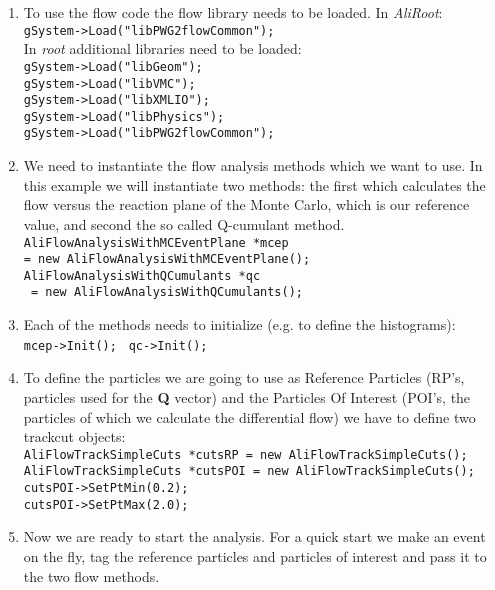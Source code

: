 \begin{enumerate}
\item
To use the flow code the flow library needs to be loaded. In  \textit{AliRoot}:\\
\texttt{gSystem->Load("libPWG2flowCommon");}\\
In  \textit{root} additional libraries need to be loaded: \\
\texttt{gSystem->Load("libGeom");}\\
\texttt{gSystem->Load("libVMC");}\\
\texttt{gSystem->Load("libXMLIO");}\\
\texttt{gSystem->Load("libPhysics");}\\
\texttt{gSystem->Load("libPWG2flowCommon");}\\
\item
We need to instantiate the flow analysis methods which we want to use. In this example we will
instantiate two methods: the first  which calculates the flow versus the reaction plane of the Monte Carlo, 
which is our reference value, and second the so called Q-cumulant method.
\texttt{AliFlowAnalysisWithMCEventPlane *mcep} \\
\texttt{= new AliFlowAnalysisWithMCEventPlane();}\\
\texttt{AliFlowAnalysisWithQCumulants *qc}\\
 \texttt{ = new AliFlowAnalysisWithQCumulants();}\\
 \item
 Each of the methods needs to initialize (e.g. to define the histograms): \\
 \texttt{mcep->Init(); }
\texttt{qc->Init();}\\
\item
To define the particles we are going to use as Reference Particles (RP's, particles 
used for the {\bf Q} vector) and the Particles Of Interest (POI's, the particles of which 
we calculate the differential flow) we have to define two trackcut objects:\\
\texttt{AliFlowTrackSimpleCuts *cutsRP = new AliFlowTrackSimpleCuts();}\\
\texttt{AliFlowTrackSimpleCuts *cutsPOI = new AliFlowTrackSimpleCuts();}\\
\texttt{cutsPOI->SetPtMin(0.2);}\\
\texttt{cutsPOI->SetPtMax(2.0);}\\
\item
Now we are ready to start the analysis.  
For a quick start we make an event on the fly, tag the reference particles and particles of interest  and pass it to the two flow methods. \\

\end{enumerate}
